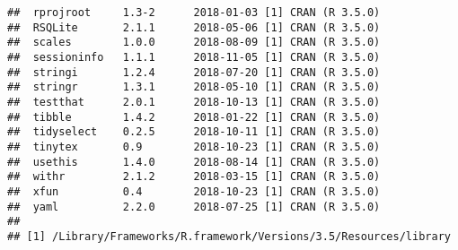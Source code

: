 \documentclass[oneside]{book}
\begin{document}
\begin{verbatim}
##  rprojroot     1.3-2      2018-01-03 [1] CRAN (R 3.5.0)                   
##  RSQLite       2.1.1      2018-05-06 [1] CRAN (R 3.5.0)                   
##  scales        1.0.0      2018-08-09 [1] CRAN (R 3.5.0)                   
##  sessioninfo   1.1.1      2018-11-05 [1] CRAN (R 3.5.0)                   
##  stringi       1.2.4      2018-07-20 [1] CRAN (R 3.5.0)                   
##  stringr       1.3.1      2018-05-10 [1] CRAN (R 3.5.0)                   
##  testthat      2.0.1      2018-10-13 [1] CRAN (R 3.5.0)                   
##  tibble        1.4.2      2018-01-22 [1] CRAN (R 3.5.0)                   
##  tidyselect    0.2.5      2018-10-11 [1] CRAN (R 3.5.0)                   
##  tinytex       0.9        2018-10-23 [1] CRAN (R 3.5.0)                   
##  usethis       1.4.0      2018-08-14 [1] CRAN (R 3.5.0)                   
##  withr         2.1.2      2018-03-15 [1] CRAN (R 3.5.0)                   
##  xfun          0.4        2018-10-23 [1] CRAN (R 3.5.0)                   
##  yaml          2.2.0      2018-07-25 [1] CRAN (R 3.5.0)                   
## 
## [1] /Library/Frameworks/R.framework/Versions/3.5/Resources/library
\end{verbatim}


\printbibliography
\end{document}
